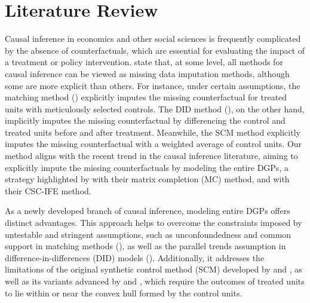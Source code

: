 \documentclass[12pt]{article}
\begin{document}
\section{Literature Review} 
\label{sec: literature}
Causal inference in economics and other social sciences is frequently complicated by the absence of counterfactuals, which are essential for evaluating the impact of a treatment or policy intervention. \cite{imbens2015causal} state that, at some level, all methods for causal inference can be viewed as missing data imputation methods, although some are more explicit than others. For instance, under certain assumptions, the matching method (\cite{abadie2006large, abadie2011bias}) explicitly imputes the missing counterfactual for treated units with meticulously selected controls. The DID method (\cite{card1993minimum, ashenfelter1978estimating}), on the other hand, implicitly imputes the missing counterfactual by differencing the control and treated units before and after treatment. Meanwhile, the SCM method explicitly imputes the missing counterfactual with a weighted average of control units. Our method aligns with the recent trend in the causal inference literature, aiming to explicitly impute the missing counterfactuals by modeling the entire DGPs, a strategy highlighted by \cite{athey2021matrix} with their matrix completion (MC) method, and \cite{xu2017generalized} with their CSC-IFE method.

As a newly developed branch of causal inference, modeling entire DGPs offers distinct advantages. This approach helps to overcome the constraints imposed by untestable and stringent assumptions, such as unconfoundedness and common support in matching methods (\cite{rosenbaum1983central, rubin1997estimating}), as well as the parallel trends assumption in difference-in-differences (DID) models (\cite{card1993minimum}). Additionally, it addresses the limitations of the original synthetic control method (SCM) developed by \cite{abadie2006large} and \cite{abadie2010synthetic}, as well as its variants advanced by \cite{ben2021augmented} and \cite{arkhangelsky2021synthetic}, which require the outcomes of treated units to lie within or near the convex hull formed by the control units.
\end{document}
